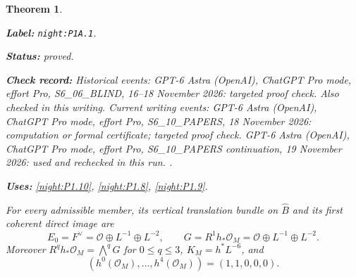 \documentclass[11pt,a4paper]{article}
\newtheorem{theorem}{Theorem}[section]
\theoremstyle{definition}
\newcommand{\StatementRecord}[4]{\par\smallskip\begingroup\upshape\raggedright\noindent\textbf{Label:} \nolinkurl{#1}.\par\noindent\textbf{Status:} #2.\par\noindent\textbf{Check record:} #3.\par\noindent\textbf{Uses:} #4.\par\endgroup\smallskip}
\begin{document}
\begin{theorem}\label{night:P1A.1}
\StatementRecord{night:P1A.1}{proved}{Historical events: GPT-6 Astra (OpenAI), ChatGPT Pro mode, effort Pro, S6\_06\_BLIND, 16--18 November 2026: targeted proof check. Also checked in this writing. Current writing events: GPT-6 Astra (OpenAI), ChatGPT Pro mode, effort Pro, S6\_10\_PAPERS, 18 November 2026: computation or formal certificate; targeted proof check. GPT-6 Astra (OpenAI), ChatGPT Pro mode, effort Pro, S6\_10\_PAPERS continuation, 19 November 2026: used and rechecked in this run. }{\cref{night:P1.10}, \cref{night:P1.8}, \cref{night:P1.9}}
For every admissible member, its vertical translation bundle on
$\widehat B$ and its first coherent direct image are
\[
 E_0=F^\vee=\mathcal O\oplus L^{-1}\oplus L^{-2},\qquad
 G=R^1h_*\mathcal O_M=\mathcal O\oplus L^{-1}\oplus L^{-2}.
\]
Moreover $R^qh_*\mathcal O_M=\bigwedge^qG$ for $0\le q\le3$,
$K_M=h^*L^{-6}$, and
\[
 (h^0(\mathcal O_M),\ldots,h^4(\mathcal O_M))=(1,1,0,0,0).
\]
\end{theorem}
\end{document}
